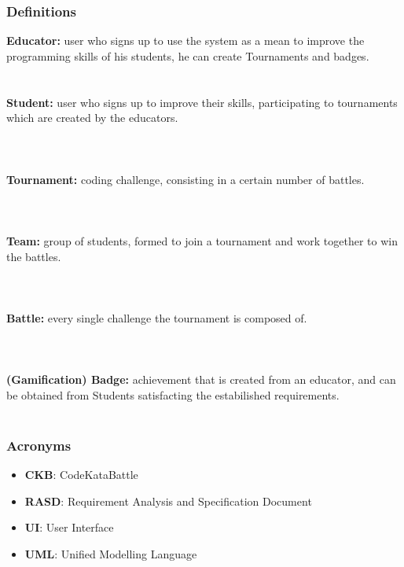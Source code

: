 \documentclass{article}
\begin{document}
\subsubsection{Definitions}
\textbf{Educator:} user who signs up to use the system as a mean to improve the programming skills of his students, he can create Tournaments
and badges.\\\\
\textbf{\\Student:} user who signs up to improve their skills, participating to tournaments which are created by the educators. \\\\\\
\textbf{\\Tournament:} coding challenge, consisting in a certain number of battles.\\\\\\
\textbf{\\Team:} group of students, formed to join a tournament and work together to win the battles.\\\\\\
\textbf{\\Battle:} every single challenge the tournament is composed of. \\\\\\
\textbf{\\(Gamification) Badge:} achievement that is created from an educator, and can be obtained from Students satisfacting the estabilished requirements.\\\\
\textbf{}
\subsubsection{Acronyms}
\begin{itemize}
    \item \textbf{CKB}: CodeKataBattle
    \item \textbf{RASD}: Requirement Analysis and Specification Document
    \item \textbf{UI}: User Interface
    \item \textbf{UML}: Unified Modelling Language
\end{itemize}
\end{document}

